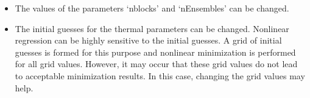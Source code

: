 \documentclass[11pt]{article}
\numberwithin{equation}{section}
\begin{document}
\begin{itemize}
  \item The values of the parameters `nblocks' and `nEnsembles' can be changed.
  \item The initial guesses for the thermal parameters can be changed. 
    Nonlinear regression can be highly sensitive to the initial
    guesses. A grid of initial guesses is formed for this purpose and nonlinear
    minimization is performed for all grid values. However, it may occur that
    these grid values do not lead to acceptable minimization results. In
    this case, changing the grid values may help.
\end{itemize}
\newpage{}


%
\end{document}
